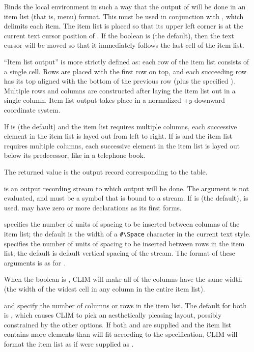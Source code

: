 Binds the local environment in such a way that the output of  will be
done in an item list (that is, menu) format.  This must be used in conjunction
with , which delimits each item.  The item list is placed so
that its upper left corner is at the current text cursor position of
.  If the boolean  is  (the default),
then the text cursor will be moved so that it immediately follows the last cell
of the item list.

``Item list output'' is more strictly defined as: each row of the item list
consists of a single cell.  Rows are placed with the first row on top, and each
succeeding row has its top aligned with the bottom of the previous row (plus the
specified ).  Multiple rows and columns are constructed after
laying the item list out in a single column.  Item list output takes place in a
normalized +$y$-downward coordinate system.

If  is  (the default) and the item list requires
multiple columns, each successive element in the item list is layed out from
left to right.  If  is  and the item list requires
multiple columns, each successive element in the item list is layed out below
its predecessor, like in a telephone book.

The returned value is the output record corresponding to the table.

 is an output recording stream to which output will be done.  The
 argument is not evaluated, and must be a symbol that is bound to a
stream.  If  is  (the default),  is
used.   may have zero or more declarations as its first forms.

 specifies the number of units of spacing to be inserted between
columns of the item list; the default is the width of a \verb+#\Space+ character
in the current text style.   specifies the number of units of
spacing to be inserted between rows in the item list; the default is default
vertical spacing of the stream.  The format of these arguments is as for
.

When the boolean  is , CLIM will make all
of the columns have the same width (the width of the widest cell in any column
in the entire item list).

 and  specify the number of columns or rows in the
item list.  The default for both is , which causes CLIM to pick an
aesthetically pleasing layout, possibly constrained by the other options.  If
both  and  are supplied and the item list contains
more elements than will fit according to the specification, CLIM will format the
item list as if  were supplied as .

